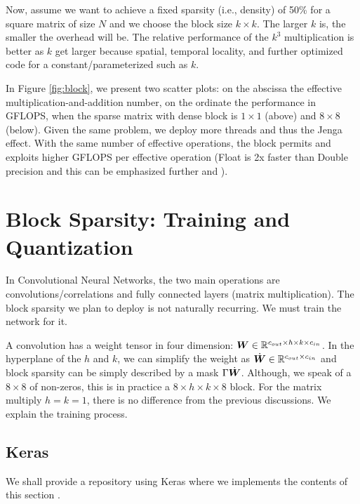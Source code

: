 \documentclass[sigconf]{acmart}
\begin{document}
Now, assume we want to achieve a fixed sparsity (i.e., density) of
50\% for a square matrix of size $N$ and we choose the block size $k
\times k$. The larger $k$ is, the smaller the overhead will be.  The
relative performance of the $k^3$ multiplication is better as $k$ get
larger because spatial, temporal locality, and further optimized code
for a constant/parameterized such as $k$.


In Figure \ref{fig:block}, we present two scatter plots: on the
abscissa the effective multiplication-and-addition number, on the
ordinate the performance in GFLOPS, when the sparse matrix with dense
block is $1\times 1$ (above) and $8\times8$ (below). Given the same
problem, we deploy more threads and thus the Jenga effect.  With the
same number of effective operations, the block permits and exploits
higher GFLOPS per effective operation (Float is 2x faster than Double
precision and this can be emphasized further
\cite{Gray2017GPUKF,li2023popsparse} and \cite{pmlr-v119-kurtz20a}).


\section{Block Sparsity: Training and Quantization}
\label{sec:training}

In Convolutional Neural Networks, the two main operations are
convolutions/correlations and fully connected layers (matrix
multiplication). The block sparsity we plan to deploy is not naturally
recurring.  We must train the network for it.

A convolution has a weight tensor in four dimension: ${\boldsymbol W} \in
\mathbb{R}^{c_{out}\times h \times k \times c_{in}}$. In the hyperplane of the
$h$ and $k$, we can simplify the weight as $\dot{{\boldsymbol W}} \in
\mathbb{R}^{c_{out} \times c_{in}}$ and block sparsity can be simply described
by a mask $\Gamma\dot{{\boldsymbol W}}$. Although, we speak of a $8\times 8$ of
non-zeros, this is in practice a $8\times h\times k\times 8$
block. For the matrix multiply $h=k=1$, there is no difference from
the previous discussions. We explain the training process.


\subsection{Keras}
We shall provide a repository using Keras \cite{chollet2015keras}
where we implements the contents of this section \cite{PaoloK2020}.
\end{document}
